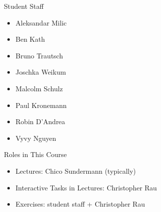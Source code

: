 \begin{frame}{\insertsubsection}
	\begin{fancycolumns}
		\begin{definition}{Student Staff}
			\begin{itemize}
				\item Aleksandar Milic
				\item Ben Kath
				\item Bruno Trautsch
				\item Joschka Weikum
				\item Malcolm Schulz
				\item Paul Kronemann
				\item Robin D'Andrea
				\item Vyvy Nguyen
			\end{itemize}
		\end{definition}
	\nextcolumn
		\begin{note}{Roles in This Course}
			\begin{itemize}
				\item Lectures: Chico Sundermann (typically)
				\item Interactive Tasks in Lectures: Christopher Rau
				\item Exercises: student staff + Christopher Rau
			\end{itemize}
		\end{note}
	\end{fancycolumns}
\end{frame}

